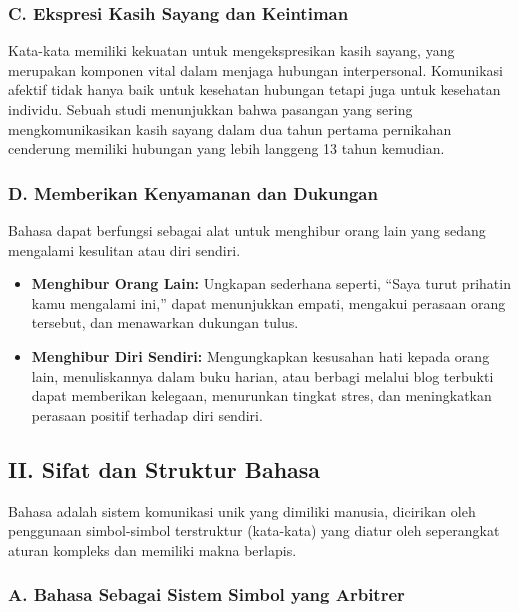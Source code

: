 \documentclass[
  letterpaper,
  DIV=11,
  numbers=noendperiod]{scrreprt}
\begin{document}
\subsubsection{C. Ekspresi Kasih Sayang dan
Keintiman}\label{c.-ekspresi-kasih-sayang-dan-keintiman}

Kata-kata memiliki kekuatan untuk mengekspresikan kasih sayang, yang
merupakan komponen vital dalam menjaga hubungan interpersonal.
Komunikasi afektif tidak hanya baik untuk kesehatan hubungan tetapi juga
untuk kesehatan individu. Sebuah studi menunjukkan bahwa pasangan yang
sering mengkomunikasikan kasih sayang dalam dua tahun pertama pernikahan
cenderung memiliki hubungan yang lebih langgeng 13 tahun kemudian.

\subsubsection{D. Memberikan Kenyamanan dan
Dukungan}\label{d.-memberikan-kenyamanan-dan-dukungan}

Bahasa dapat berfungsi sebagai alat untuk menghibur orang lain yang
sedang mengalami kesulitan atau diri sendiri.

\begin{itemize}
\item
  \textbf{Menghibur Orang Lain:} Ungkapan sederhana seperti, ``Saya
  turut prihatin kamu mengalami ini,'' dapat menunjukkan empati,
  mengakui perasaan orang tersebut, dan menawarkan dukungan tulus.
\item
  \textbf{Menghibur Diri Sendiri:} Mengungkapkan kesusahan hati kepada
  orang lain, menuliskannya dalam buku harian, atau berbagi melalui blog
  terbukti dapat memberikan kelegaan, menurunkan tingkat stres, dan
  meningkatkan perasaan positif terhadap diri sendiri.
\end{itemize}

\subsection{II. Sifat dan Struktur
Bahasa}\label{ii.-sifat-dan-struktur-bahasa}

Bahasa adalah sistem komunikasi unik yang dimiliki manusia, dicirikan
oleh penggunaan simbol-simbol terstruktur (kata-kata) yang diatur oleh
seperangkat aturan kompleks dan memiliki makna berlapis.

\subsubsection{A. Bahasa Sebagai Sistem Simbol yang
Arbitrer}\label{a.-bahasa-sebagai-sistem-simbol-yang-arbitrer}
\end{document}
